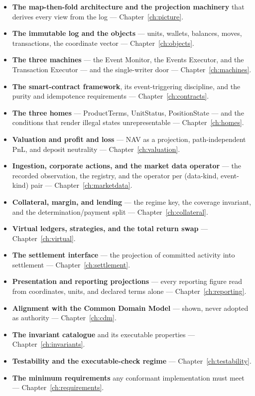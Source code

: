\begin{itemize}[leftmargin=*, itemsep=2.5pt]
\item \textbf{The map-then-fold architecture and the projection machinery} that derives
  every view from the log --- Chapter~\ref{ch:picture}.
\item \textbf{The immutable log and the objects} --- units, wallets, balances, moves,
  transactions, the coordinate vector --- Chapter~\ref{ch:objects}.
\item \textbf{The three machines} --- the Event Monitor, the Events Executor, and the
  Transaction Executor --- and the single-writer door --- Chapter~\ref{ch:machines}.
\item \textbf{The smart-contract framework}, its event-triggering discipline, and the
  purity and idempotence requirements --- Chapter~\ref{ch:contracts}.
\item \textbf{The three homes} --- ProductTerms, UnitStatus, PositionState --- and the
  conditions that render illegal states unrepresentable --- Chapter~\ref{ch:homes}.
\item \textbf{Valuation and profit and loss} --- NAV as a projection, path-independent PnL,
  and deposit neutrality --- Chapter~\ref{ch:valuation}.
\item \textbf{Ingestion, corporate actions, and the market data operator} --- the recorded
  observation, the registry, and the operator per (data-kind, event-kind) pair ---
  Chapter~\ref{ch:marketdata}.
\item \textbf{Collateral, margin, and lending} --- the regime key, the coverage invariant,
  and the determination/payment split --- Chapter~\ref{ch:collateral}.
\item \textbf{Virtual ledgers, strategies, and the total return swap} ---
  Chapter~\ref{ch:virtual}.
\item \textbf{The settlement interface} --- the projection of committed activity into
  settlement --- Chapter~\ref{ch:settlement}.
\item \textbf{Presentation and reporting projections} --- every reporting figure read from
  coordinates, units, and declared terms alone --- Chapter~\ref{ch:reporting}.
\item \textbf{Alignment with the Common Domain Model} --- shown, never adopted as authority
  --- Chapter~\ref{ch:cdm}.
\item \textbf{The invariant catalogue} and its executable properties ---
  Chapter~\ref{ch:invariants}.
\item \textbf{Testability and the executable-check regime} ---
  Chapter~\ref{ch:testability}.
\item \textbf{The minimum requirements} any conformant implementation must meet ---
  Chapter~\ref{ch:requirements}.
\end{itemize}

